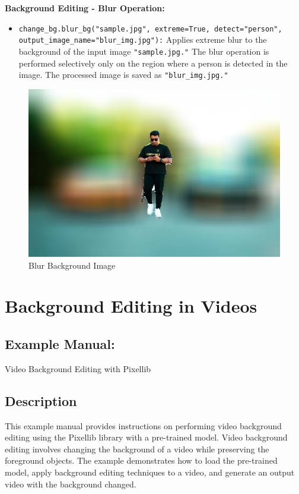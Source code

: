 \textbf{Background Editing - Blur Operation:}
\begin{itemize}
    \item \texttt{change\_bg.blur\_bg("sample.jpg", extreme=True, detect="person", output\_image\_name="blur\_img.jpg"):} Applies extreme blur to the background of the input image \texttt{"sample.jpg."} The blur operation is performed selectively only on the region where a person is detected in the image. The processed image is saved as \texttt{"blur\_img.jpg."}
\end{itemize}

\begin{figure}[h!]
    \centering
    \includegraphics[width=0.8\linewidth]{Images/PixelLib/blur_person.jpg} %
    
    \caption{Blur Background Image}
    \label{fig:your_image_label}
\end{figure}
\newpage

\section{Background Editing in Videos}
\subsection{Example Manual:}
Video Background Editing with Pixellib

\subsection{Description}
This example manual provides instructions on performing video background editing using the Pixellib library with a pre-trained model. Video background editing involves changing the background of a video while preserving the foreground objects. The example demonstrates how to load the pre-trained model, apply background editing techniques to a video, and generate an output video with the background changed.

